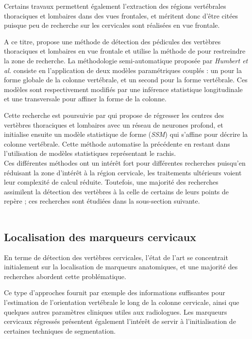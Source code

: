        Certains travaux permettent également l'extraction des régions vertébrales thoraciques et lombaires dans des vues frontales, et méritent donc d'être citées puisque peu de recherche sur les cervicales sont réalisées en vue frontale.

        A ce titre, \cite{Ebrahimi2018} propose une méthode de détection des pédicules des vertèbres thoraciques et lombaires en vue frontale et utilise la méthode de \cite{Humbert2009} pour restreindre la zone de recherche. La méthodologie semi-automatique proposée par {\itshape Humbert et al.} consiste en l'application de deux modèles paramétriques couplés : un pour la forme globale de la colonne vertébrale, et un second pour la forme vertébrale. Ces modèles sont respectivement modifiés par une inférence statistique \og longitudinale \fg et une \og transversale \fg pour affiner la forme de la colonne.

        Cette recherche est poursuivie par \cite{Aubert2016} qui propose de régresser les centres des vertèbres thoraciques et lombaires avec un réseau de neurones profond, et initialise ensuite un modèle statistique de forme ({\itshape SSM}) qui s'affine pour décrire la colonne vertébrale. Cette méthode automatise la précédente en restant dans l'utilisation de modèles statistiques représentant le rachis.
        \\

        Ces différentes méthodes ont un intérêt fort pour différentes recherches puisqu'en réduisant la zone d'intérêt à la région cervicale, les traitements ultérieurs voient leur complexité de calcul réduite. Toutefois, une majorité des recherches assimilent la détection des vertèbres à la celle de certains de leurs points de repère ; ces recherches sont étudiées dans la sous-section suivante.
        \\\\

    \subsection{Localisation des marqueurs cervicaux}

        En terme de détection des vertèbres cervicales, l'état de l'art se concentrait initialement sur la localisation de marqueurs anatomiques, et une majorité des recherches abordent cette problématique.

        Ce type d'approches fournit par exemple des informations suffisantes pour l'estimation de l'orientation vertébrale le long de la colonne cervicale, ainsi que quelques autres paramètres cliniques utiles aux radiologues. Les marqueurs cervicaux régressés présentent également l'intérêt de servir à l'initialisation de certaines techniques de segmentation.
        \\

